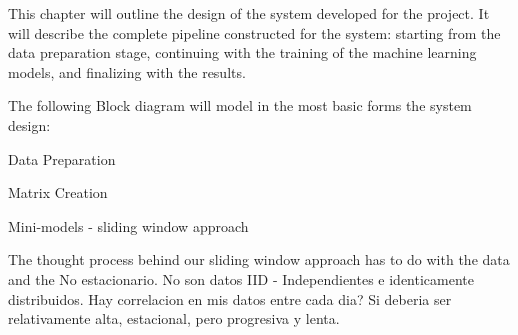 \documentclass[12pt]{report} %
\begin{document}
This chapter will outline the design of the system developed for the project. It will describe the complete pipeline constructed for the system: starting from the data preparation stage, continuing with the training of the machine learning models, and finalizing with the results.

The following Block diagram will model in the most basic forms the system design:








\begin{center}
\end{center}


Data Preparation

Matrix Creation

Mini-models - sliding window approach

The thought process behind our sliding window approach has to do with the data and the
No estacionario. No son datos IID - Independientes e identicamente distribuidos.
Hay correlacion en mis datos entre cada dia? Si deberia ser relativamente alta, estacional, pero progresiva y lenta.
\end{document}

